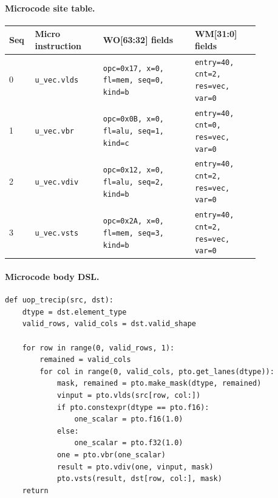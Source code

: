 \paragraph{Microcode site table.}
{\scriptsize
\begin{longtable}{@{}R{0.055\linewidth}L{0.23\linewidth}L{0.31\linewidth}L{0.22\linewidth}@{}}
\toprule
Seq & Micro instruction & WO[63:32] fields & WM[31:0] fields \\
 & \texttt{u\_vec.vlds} & \texttt{opc=0x17, x=0, fl=mem, seq=0, kind=b} & \texttt{entry=40, cnt=2, res=vec, var=0} \\
1 & \texttt{u\_vec.vbr} & \texttt{opc=0x0B, x=0, fl=alu, seq=1, kind=c} & \texttt{entry=40, cnt=0, res=vec, var=0} \\
2 & \texttt{u\_vec.vdiv} & \texttt{opc=0x12, x=0, fl=alu, seq=2, kind=b} & \texttt{entry=40, cnt=2, res=vec, var=0} \\
3 & \texttt{u\_vec.vsts} & \texttt{opc=0x2A, x=0, fl=mem, seq=3, kind=b} & \texttt{entry=40, cnt=2, res=vec, var=0} \\
\bottomrule
\end{longtable}
}
\paragraph{Microcode body DSL.}
\begin{lstlisting}[style=ptocode]
def uop_trecip(src, dst):
    dtype = dst.element_type
    valid_rows, valid_cols = dst.valid_shape

    for row in range(0, valid_rows, 1):
        remained = valid_cols
        for col in range(0, valid_cols, pto.get_lanes(dtype)):
            mask, remained = pto.make_mask(dtype, remained)
            vinput = pto.vlds(src[row, col:])
            if pto.constexpr(dtype == pto.f16):
                one_scalar = pto.f16(1.0)
            else:
                one_scalar = pto.f32(1.0)
            one = pto.vbr(one_scalar)
            result = pto.vdiv(one, vinput, mask)
            pto.vsts(result, dst[row, col:], mask)
    return
\end{lstlisting}
\Needspace{0.34\textheight}
